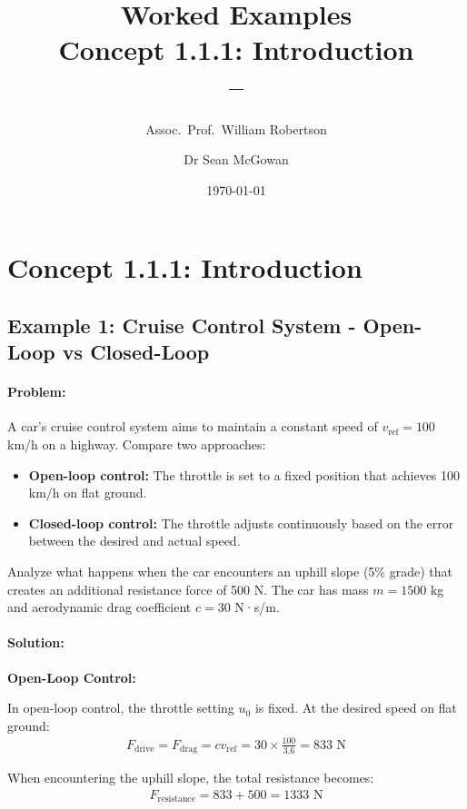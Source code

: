 \documentclass[11pt,a4paper]{article}
\title{\textbf{Worked Examples}\\[0.5em]
\large Concept 1.1.1: Introduction\\[0.3em]
\normalsize \coursesubtitle{} -- \coursetitle}
\author{Assoc.\ Prof.\ William Robertson \and Dr Sean McGowan}
\date{\today}
\begin{document}
\maketitle
\tableofcontents
\newpage

\section{Concept 1.1.1: Introduction}

\subsection{Example 1: Cruise Control System - Open-Loop vs Closed-Loop}

\paragraph{Problem:} A car's cruise control system aims to maintain a constant speed of $v_{\text{ref}} = 100$ km/h on a highway. Compare two approaches:
\begin{itemize}
  \item \textbf{Open-loop control:} The throttle is set to a fixed position that achieves 100 km/h on flat ground.
  \item \textbf{Closed-loop control:} The throttle adjusts continuously based on the error between the desired and actual speed.
\end{itemize}

Analyze what happens when the car encounters an uphill slope (5\% grade) that creates an additional resistance force of 500 N. The car has mass $m = 1500$ kg and aerodynamic drag coefficient $c = 30$ N·s/m.

\paragraph{Solution:}

\textbf{Open-Loop Control:}

In open-loop control, the throttle setting $u_0$ is fixed. At the desired speed on flat ground:
\begin{align}
  F_{\text{drive}} = F_{\text{drag}} = cv_{\text{ref}} = 30 \times \frac{100}{3.6} = 833 \text{ N}
\end{align}

When encountering the uphill slope, the total resistance becomes:
\begin{align}
  F_{\text{resistance}} = 833 + 500 = 1333 \text{ N}
\end{align}
\end{document}
